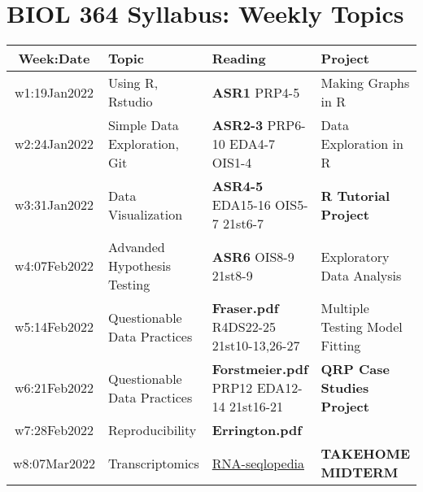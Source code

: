 \documentclass[11pt]{article} %
\begin{document}
\section{BIOL 364 Syllabus: Weekly Topics}
\begin{table}[ht] 
	\centering %
	\begin{tabular}{| c | m{5cm} | m{3cm} | m{5.5cm} |} %
	\hline %
	{\bf Week:Date} & {\bf Topic} & {\bf Reading} & {\bf Project}  \\ %
	\hline 
	\hline %
  w1:19Jan2022 & Using R, Rstudio & {\bf ASR1} \newline PRP4-5 & Making Graphs in R \\ %
	\hline
	w2:24Jan2022 & Simple Data Exploration, Git & {\bf ASR2-3} \newline PRP6-10 \newline EDA4-7 \newline OIS1-4  & Data Exploration in R \\ 
	\hline
	w3:31Jan2022 & Data Visualization & {\bf ASR4-5} \newline EDA15-16 \newline OIS5-7 \newline 21st6-7 & {\bf R Tutorial Project}\\ 
	\hline 
	w4:07Feb2022 & Advanded Hypothesis Testing & {\bf ASR6} \newline {\bf ASA.pdf} \newline OIS8-9 \newline 21st8-9  & Exploratory Data Analysis \\ 
	\hline 
	w5:14Feb2022 & Questionable Data Practices & {\bf Fraser.pdf} \newline R4DS22-25 \newline 21st10-13,26-27 & Multiple Testing \newline Model Fitting \\ 
	\hline 
	w6:21Feb2022 & Questionable Data Practices & {\bf Forstmeier.pdf} \newline PRP12 \newline EDA12-14 \newline 21st16-21  & {\bf QRP Case Studies Project} \\ 
	\hline 
	w7:28Feb2022 & Reproducibility & {\bf Errington.pdf} &  \\ 
	\hline 
	w8:07Mar2022 & Transcriptomics & \href{https://rnaseq.uoregon.edu/}{RNA-seqlopedia} & {\bf TAKEHOME MIDTERM} \\ 

\end{tabular}
\end{table}
\end{document}
